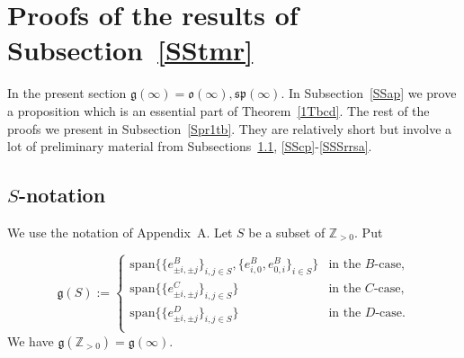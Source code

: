 \documentclass{emsprocart}
\newcommand{\PenkovPetukhovBr}[1]{\mathrm{span}\{#1\}}
\begin{document}
\section{Proofs of the results of Subsection~\ref{SStmr}}\label{S6}
In the present section $\mathfrak g(\infty)=\mathfrak o(\infty), \mathfrak{sp}(\infty)$. In Subsection~\ref{SSap} we prove a proposition which is an essential part of Theorem~\ref{1Tbcd}. The rest of the proofs we present in Subsection~\ref{Spr1tb}. They are relatively short but involve a lot of preliminary material from Subsections~\ref{SSsnot}, \ref{SScp}-\ref{SSSrrsa}.
\subsection{$S$-notation}\label{SSsnot}
We use the notation of Appendix~A. Let $S$ be a subset of $\mathbb Z_{>0}$. Put

$$\mathfrak g(S):=\begin{cases} \PenkovPetukhovBr{\{e^B_{\pm i, \pm j}\}_{i, j\in S}, \{e^B_{i, 0}, e^B_{0, i}\}_{i\in S}}&\mbox{in~the~$B$-case,}\\
\PenkovPetukhovBr{\{e^C_{\pm i, \pm j}\}_{i, j\in S}}&\mbox{in~the~$C$-case,}\\
\PenkovPetukhovBr{\{e^D_{\pm i, \pm j}\}_{i, j\in S}}&\mbox{in~the~$D$-case.}\\
\end{cases}$$
We have $\mathfrak g(\mathbb Z_{>0})=\mathfrak g(\infty)$.
\end{document}
